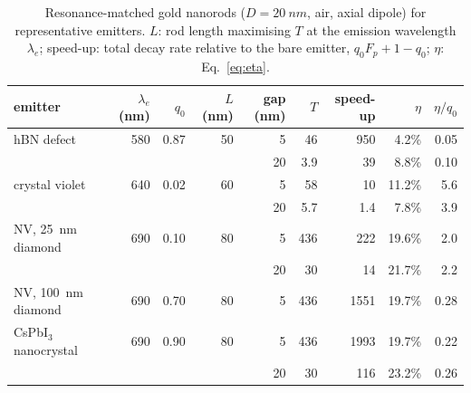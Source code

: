\documentclass[11pt,a4paper]{article}
\newcommand{\Fp}{F_p}
\begin{document}
\begin{table}[t]\centering
\caption{Resonance-matched gold nanorods ($D=\SI{20}{nm}$, air, axial dipole) for representative emitters. $L$:
rod length maximising $T$ at the emission wavelength $\lambda_e$; speed-up: total decay rate relative to the bare
emitter, $q_0\Fp+1-q_0$; $\eta$: Eq.~\eqref{eq:eta}.}\label{tab:emit}
\begin{tabular}{lrrrrrrrr}\toprule
emitter & $\lambda_e$ (nm) & $q_0$ & $L$ (nm) & gap (nm) & $T$ & speed-up & $\eta$ & $\eta/q_0$\\\midrule
hBN defect~\cite{nikolay2019} & 580 & 0.87 & 50 & 5  & 46  & 950  & 4.2\% & 0.05\\
                              &     &      &    & 20 & 3.9 & 39   & 8.8\% & 0.10\\
crystal violet~\cite{khatua}  & 640 & 0.02 & 60 & 5  & 58  & 10   & 11.2\% & 5.6\\
                              &     &      &    & 20 & 5.7 & 1.4  & 7.8\% & 3.9\\
NV, \SI{25}{nm} diamond~\cite{mohtashami2013} & 690 & 0.10 & 80 & 5 & 436 & 222 & 19.6\% & 2.0\\
                              &     &      &    & 20 & 30  & 14   & 21.7\% & 2.2\\
NV, \SI{100}{nm} diamond~\cite{mohtashami2013} & 690 & 0.70 & 80 & 5 & 436 & \num{1551} & 19.7\% & 0.28\\
CsPbI$_3$ nanocrystal~\cite{protesescu2015} & 690 & 0.90 & 80 & 5 & 436 & \num{1993} & 19.7\% & 0.22\\
                              &     &      &    & 20 & 30  & 116  & 23.2\% & 0.26\\\bottomrule
\end{tabular}
\end{table}
\end{document}
